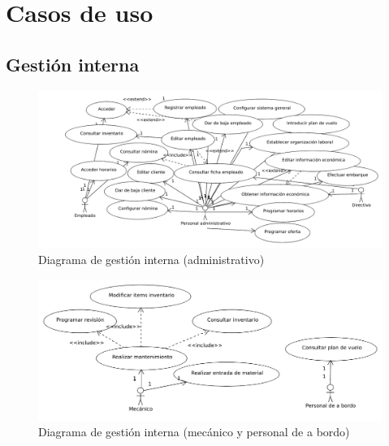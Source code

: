 \documentclass[11pt, a4paper, twoside, titlepage]{article}
\begin{document}
	\section{Casos de uso}
	
	\subsection{Gestión interna} \vspace{.5cm}
	\iniciarnumeraciondiedral

	\ifpdf
	\begin{figure}	%
		\hspace*{-2cm}\includegraphics[scale=.9]{diagramas/gestioninterna1.pdf}
		\caption{Diagrama de gestión interna (administrativo)}
	\end{figure}
	\fi

	\ifpdf
	\begin{figure}
		\hspace*{0cm}\includegraphics[scale=.9]{diagramas/gestioninterna2.pdf}
		\caption{Diagrama de gestión interna (mecánico y personal de a bordo)}
	\end{figure}
	\fi
\end{document}
